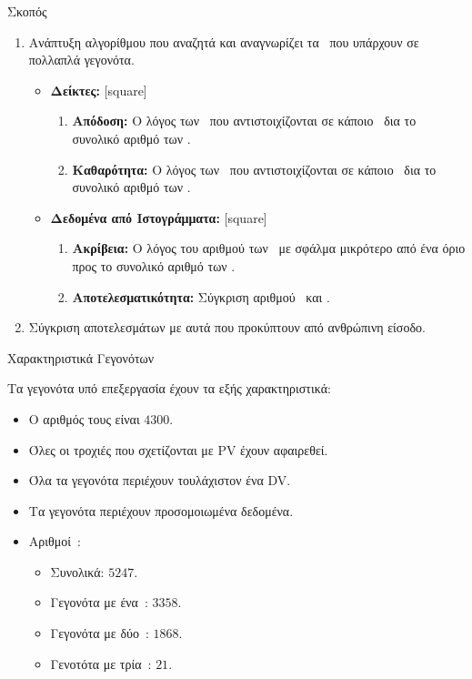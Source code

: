 \begin{frame}{Σκοπός}

	\begin{enumerate}
		\item Ανάπτυξη αλγορίθμου που αναζητά και αναγνωρίζει τα \dvtrue\ που υπάρχουν σε πολλαπλά γεγονότα.	
		\begin{itemize}
			\item \textbf{Δείκτες:}
				[square]
				\begin{enumerate}
					\item \textbf{Απόδοση:} Ο λόγος των \dvtrue\ που αντιστοιχίζονται σε κάποιο \dvreco\ δια το συνολικό αριθμό των \dvtrue.
					\item \textbf{Καθαρότητα:} Ο λόγος των \dvreco\ που αντιστοιχίζονται σε κάποιο \dvtrue\ δια το συνολικό αριθμό των \dvreco.
				\end{enumerate}
			\item \textbf{Δεδομένα από Ιστογράμματα:}	
				[square]
				\begin{enumerate}
					\item \textbf{Ακρίβεια:} Ο λόγος του αριθμού των \dvreco\ με σφάλμα μικρότερο από ένα όριο προς το συνολικό αριθμό των \dvreco.
					\item \textbf{Αποτελεσματικότητα:} Σύγκριση αριθμού \dvreco\ και \dvtrue.
				\end{enumerate}
		\end{itemize}
		\item Σύγκριση αποτελεσμάτων με αυτά που προκύπτουν από ανθρώπινη είσοδο.
	\end{enumerate}

\end{frame}

\begin{frame}{Χαρακτηριστικά Γεγονότων}
	
	Τα γεγονότα υπό επεξεργασία έχουν τα εξής χαρακτηριστικά:
	\vspace{4mm}
	\begin{itemize}
		\item Ο αριθμός τους είναι $4300$.
		\item Όλες οι τροχιές που σχετίζονται με PV έχουν αφαιρεθεί.
		\item Όλα τα γεγονότα περιέχουν τουλάχιστον ένα DV.
		\item Τα γεγονότα περιέχουν προσομοιωμένα δεδομένα.
		\item Αριθμοί \dvtrue\,:
			\begin{itemize}
				\item Συνολικά: $5247$.
				\item Γεγονότα με ένα \dvtrue\,: $3358$.
				\item Γεγονότα με δύο \dvtrue\,: $1868$.
				\item Γενοτότα με τρία \dvtrue\,: $21$.
			\end{itemize}
	\end{itemize}
	
\end{frame}
